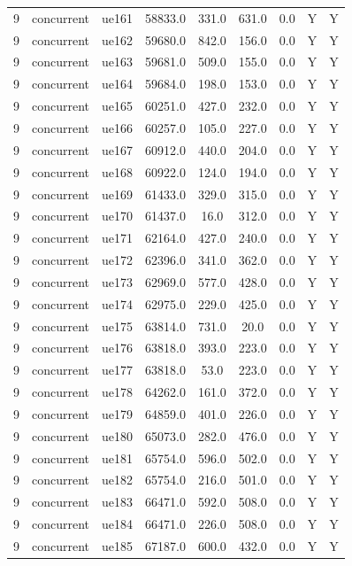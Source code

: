 \begin{table}[ht]
\begin{tabular}{|c|c|c|c|c|c|c|c|c|}
9 & concurrent & ue161 & 58833.0 & 331.0 & 631.0 & 0.0 & Y & Y \\
9 & concurrent & ue162 & 59680.0 & 842.0 & 156.0 & 0.0 & Y & Y \\
9 & concurrent & ue163 & 59681.0 & 509.0 & 155.0 & 0.0 & Y & Y \\
9 & concurrent & ue164 & 59684.0 & 198.0 & 153.0 & 0.0 & Y & Y \\
9 & concurrent & ue165 & 60251.0 & 427.0 & 232.0 & 0.0 & Y & Y \\
9 & concurrent & ue166 & 60257.0 & 105.0 & 227.0 & 0.0 & Y & Y \\
9 & concurrent & ue167 & 60912.0 & 440.0 & 204.0 & 0.0 & Y & Y \\
9 & concurrent & ue168 & 60922.0 & 124.0 & 194.0 & 0.0 & Y & Y \\
9 & concurrent & ue169 & 61433.0 & 329.0 & 315.0 & 0.0 & Y & Y \\
9 & concurrent & ue170 & 61437.0 & 16.0 & 312.0 & 0.0 & Y & Y \\
9 & concurrent & ue171 & 62164.0 & 427.0 & 240.0 & 0.0 & Y & Y \\
9 & concurrent & ue172 & 62396.0 & 341.0 & 362.0 & 0.0 & Y & Y \\
9 & concurrent & ue173 & 62969.0 & 577.0 & 428.0 & 0.0 & Y & Y \\
9 & concurrent & ue174 & 62975.0 & 229.0 & 425.0 & 0.0 & Y & Y \\
9 & concurrent & ue175 & 63814.0 & 731.0 & 20.0 & 0.0 & Y & Y \\
9 & concurrent & ue176 & 63818.0 & 393.0 & 223.0 & 0.0 & Y & Y \\
9 & concurrent & ue177 & 63818.0 & 53.0 & 223.0 & 0.0 & Y & Y \\
9 & concurrent & ue178 & 64262.0 & 161.0 & 372.0 & 0.0 & Y & Y \\
9 & concurrent & ue179 & 64859.0 & 401.0 & 226.0 & 0.0 & Y & Y \\
9 & concurrent & ue180 & 65073.0 & 282.0 & 476.0 & 0.0 & Y & Y \\
9 & concurrent & ue181 & 65754.0 & 596.0 & 502.0 & 0.0 & Y & Y \\
9 & concurrent & ue182 & 65754.0 & 216.0 & 501.0 & 0.0 & Y & Y \\
9 & concurrent & ue183 & 66471.0 & 592.0 & 508.0 & 0.0 & Y & Y \\
9 & concurrent & ue184 & 66471.0 & 226.0 & 508.0 & 0.0 & Y & Y \\
9 & concurrent & ue185 & 67187.0 & 600.0 & 432.0 & 0.0 & Y & Y \\

\end{tabular}
\end{table}
